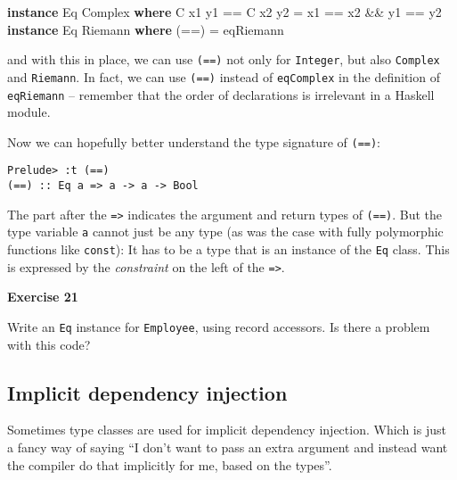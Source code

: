 \documentclass[11pt,
  american,
  DIV13]{article}
\newenvironment{Shaded}{}{}
\newcommand{\DataTypeTok}[1]{\textcolor[rgb]{0.56,0.13,0.00}{#1}}
\newcommand{\KeywordTok}[1]{\textcolor[rgb]{0.00,0.44,0.13}{\textbf{#1}}}
\newcommand{\NormalTok}[1]{#1}
\newcommand{\OperatorTok}[1]{\textcolor[rgb]{0.40,0.40,0.40}{#1}}
\newcommand{\OtherTok}[1]{\textcolor[rgb]{0.00,0.44,0.13}{#1}}
\begin{document}
\begin{Shaded}
\begin{Highlighting}[]
\KeywordTok{instance} \DataTypeTok{Eq} \DataTypeTok{Complex} \KeywordTok{where}
    \DataTypeTok{C}\NormalTok{ x1 y1 }\OperatorTok{==} \DataTypeTok{C}\NormalTok{ x2 y2 }\OtherTok{=}\NormalTok{ x1 }\OperatorTok{==}\NormalTok{ x2 }\OperatorTok{\&\&}\NormalTok{ y1 }\OperatorTok{==}\NormalTok{ y2}
\KeywordTok{instance} \DataTypeTok{Eq} \DataTypeTok{Riemann} \KeywordTok{where}
\NormalTok{    (}\OperatorTok{==}\NormalTok{) }\OtherTok{=}\NormalTok{ eqRiemann}
\end{Highlighting}
\end{Shaded}

and with this in place, we can use \texttt{(==)} not only for
\texttt{Integer}, but also \texttt{Complex} and \texttt{Riemann}. In
fact, we can use \texttt{(==)} instead of \texttt{eqComplex} in the
definition of \texttt{eqRiemann} -- remember that the order of
declarations is irrelevant in a Haskell module.

Now we can hopefully better understand the type signature of
\texttt{(==)}:

\begin{verbatim}
Prelude> :t (==)
(==) :: Eq a => a -> a -> Bool
\end{verbatim}

The part after the \texttt{=\textgreater{}} indicates the argument and
return types of \texttt{(==)}. But the type variable \texttt{a} cannot
just be any type (as was the case with fully polymorphic functions like
\texttt{const}): It has to be a type that is an instance of the
\texttt{Eq} class. This is expressed by the \emph{constraint} on the
left of the \texttt{=\textgreater{}}.

\textbf{Exercise 21}

Write an \texttt{Eq} instance for \texttt{Employee}, using record
accessors. Is there a problem with this code?

\hypertarget{implicit-dependency-injection}{%
\subsection{Implicit dependency
injection}\label{implicit-dependency-injection}}

Sometimes type classes are used for implicit dependency injection. Which
is just a fancy way of saying ``I don't want to pass an extra argument
and instead want the compiler do that implicitly for me, based on the
types''.
\end{document}
